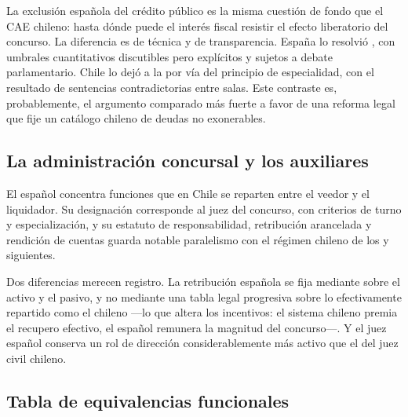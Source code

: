 \begin{practica}
La exclusión española del crédito público es la misma cuestión de fondo que el CAE chileno: hasta
dónde puede el interés fiscal resistir el efecto liberatorio del concurso. La diferencia es de
técnica y de transparencia. España lo resolvió , con umbrales cuantitativos
discutibles pero explícitos y sujetos a debate parlamentario. Chile lo dejó a la
 por vía del principio de especialidad, con el resultado de
sentencias contradictorias entre salas. Este contraste es, probablemente, el argumento comparado
más fuerte a favor de una reforma legal que fije un catálogo chileno de deudas no exonerables.
\end{practica}

\subsection{La administración concursal y los auxiliares}

El  español concentra funciones que en Chile se reparten entre el
veedor y el liquidador. Su designación corresponde al juez del concurso, con criterios de turno y
especialización, y su estatuto de responsabilidad, retribución arancelada y rendición de cuentas
guarda notable paralelismo con el régimen chileno de los  y siguientes.

Dos diferencias merecen registro. La retribución española se fija mediante  sobre el activo y el pasivo, y no mediante una tabla legal progresiva sobre lo
efectivamente repartido como el  chileno ---lo que altera los incentivos: el sistema
chileno premia el recupero efectivo, el español remunera la magnitud del concurso---. Y el juez
español conserva un rol de dirección considerablemente más activo que el del juez civil chileno.

\bloquePractico

\subsection{Tabla de equivalencias funcionales}

